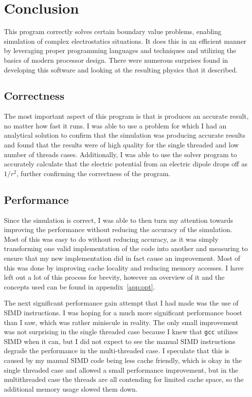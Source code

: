 \section{Conclusion}

This program correctly solves certain boundary value problems, enabling simulation
of complex electrostatics situations. It does this in an efficient manner by leveraging
proper programming languages and techniques and utilizing the basics of modern processor
design. There were numerous surprises found in developing this software and looking at
the resulting physics that it described.

\subsection{Correctness}

The most important aspect of this program is that is produces an accurate result, no
matter how fast it runs. I was able to use a problem for which I had an analytical
solution to confirm that the simulation was producing accurate results and found that
the results were of high quality for the single threaded and low number of threads
cases. Additionally, I was able to use the solver program to accurately calculate
that the electric potential from an electric dipole drops off as $1/r^2$, further
confirming the correctness of the program.


\subsection{Performance}

Since the simulation is correct, I was able to then turn my attention towards improving
the performance without reducing the accuracy of the simulation. Most of this was easy to
do without reducing accuracy, as it was simply transforming one valid implementation of
the code into another and measuring to ensure that my new implementation did in fact
cause an improvement. Most of this was done by improving cache locality and reducing
memory accesses. I have left out a lot of this process for brevity, however an overview
of it and the concepts used can be found in appendix~\ref{app:opt}.

The next significant performance gain attempt that I had made was the use of SIMD instructions.
I was hoping for a much more significant performance boost than I saw, which was rather
miniscule in reality. The only small improvement was not surprising in the single threaded
case because I knew that \texttt{gcc} utilizes SIMD when it can, but I did not expect to see
the manual SIMD instructions degrade the performance in the multi-threaded case. I speculate
that this is caused by my manual SIMD code being less cache friendly, which is okay in the
single threaded case and allowed a small performance improvement, but in the multithreaded case
the threads are all contending for limited cache space, so the additional memory usage slowed
them down.

